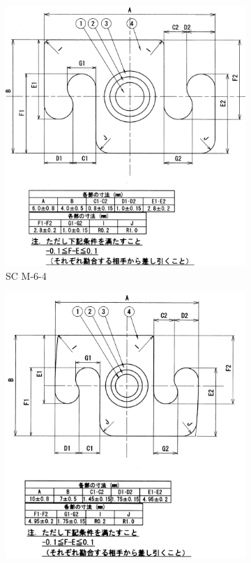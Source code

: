 \documentclass[report]{jlreq}
\begin{document}
\begin{figure}
  \centering
    \begin{subfigure}{0.45\columnwidth}
    \centering
    \includegraphics[width=\columnwidth]{SC_M-6-4.jpg}
    \caption{SC M-6-4}
    \label{fig:SC_M-6-4}
    \end{subfigure}
    \hspace{5mm}
    \begin{subfigure}{0.45\columnwidth}
   \centering 
    \includegraphics[width=\columnwidth]{SC_M-10-7.jpg}

\end{subfigure}
\end{figure}
\end{document}
